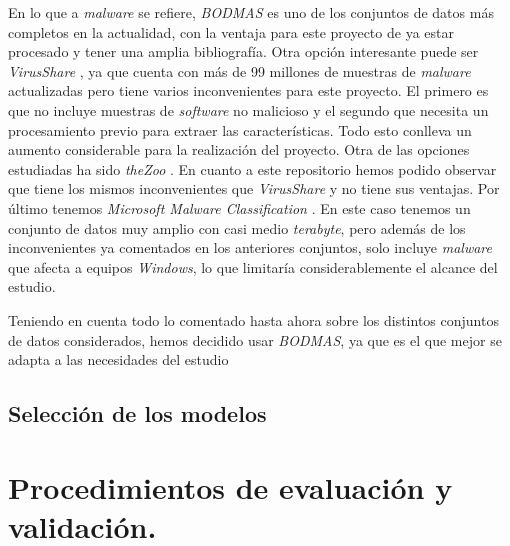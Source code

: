En lo que a \textit{malware} se refiere, \textit{BODMAS} \cite{bodmas} es uno de los conjuntos de datos más completos en la actualidad, con la ventaja para este proyecto de ya estar procesado y tener una amplia bibliografía. Otra opción interesante puede ser \textit{VirusShare} \cite{virusshare}, ya que cuenta con más de 99 millones de muestras de \textit{malware} actualizadas pero tiene varios inconvenientes para este proyecto. El primero es que no incluye muestras de \textit{software} no malicioso y el segundo que necesita un procesamiento previo para extraer las características. Todo esto conlleva un aumento considerable para la realización del proyecto. Otra de las opciones estudiadas ha sido \textit{theZoo} \cite{thezoo}. En cuanto a este repositorio hemos podido observar que tiene los mismos inconvenientes que \textit{VirusShare} y no tiene sus ventajas. Por último tenemos \textit{Microsoft Malware Classification} \cite{malware-classification}. En este caso tenemos un conjunto de datos muy amplio con casi medio \textit{terabyte}, pero además de los inconvenientes ya comentados en los anteriores conjuntos, solo incluye \textit{malware} que afecta a equipos \textit{Windows}, lo que limitaría considerablemente el alcance del estudio.

\vspace{1em}

Teniendo en cuenta todo lo comentado hasta ahora sobre los distintos conjuntos de datos considerados, hemos decidido usar \textit{BODMAS}, ya que es el que mejor se adapta a las necesidades del estudio

\subsection{Selección de los modelos}
\label{subsec:select_model}

\section{Procedimientos de evaluación y validación.}

